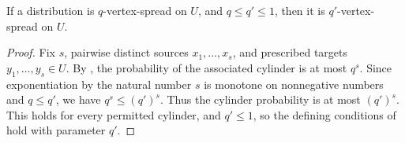 \begin{lemma}
If a distribution is $q$-vertex-spread on $U$, and $q\leq q'\leq1$, then it is $q'$-vertex-spread on $U$.
\end{lemma}
\begin{proof}
Fix $s$, pairwise distinct sources $x_1,\ldots,x_s$, and prescribed targets $y_1,\ldots,y_s\in U$.  By , the probability of the associated cylinder is at most $q^s$.  Since exponentiation by the natural number $s$ is monotone on nonnegative numbers and $q\leq q'$, we have $q^s\leq(q')^s$.  Thus the cylinder probability is at most $(q')^s$.  This holds for every permitted cylinder, and $q'\leq1$, so the defining conditions of  hold with parameter $q'$.
\end{proof}
